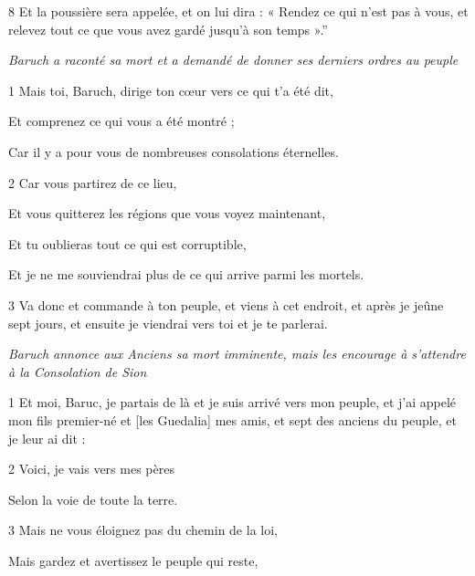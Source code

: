 \par 8 Et la poussière sera appelée, et on lui dira : « Rendez ce qui n'est pas à vous, et relevez tout ce que vous avez gardé jusqu'à son temps ».''



\par \textit{Baruch a raconté sa mort et a demandé de donner ses derniers ordres au peuple}

\par 1 Mais toi, Baruch, dirige ton cœur vers ce qui t'a été dit,

\par Et comprenez ce qui vous a été montré ;

\par Car il y a pour vous de nombreuses consolations éternelles.

\par 2 Car vous partirez de ce lieu,

\par Et vous quitterez les régions que vous voyez maintenant,

\par Et tu oublieras tout ce qui est corruptible,

\par Et je ne me souviendrai plus de ce qui arrive parmi les mortels.

\par 3 Va donc et commande à ton peuple, et viens à cet endroit, et après je jeûne sept jours, et ensuite je viendrai vers toi et je te parlerai.

\par \textit{Baruch annonce aux Anciens sa mort imminente, mais les encourage à s'attendre à la Consolation de Sion}


\par 1 Et moi, Baruc, je partais de là et je suis arrivé vers mon peuple, et j'ai appelé mon fils premier-né et [les Guedalia] mes amis, et sept des anciens du peuple, et je leur ai dit :

\par 2 Voici, je vais vers mes pères

\par Selon la voie de toute la terre.

\par 3 Mais ne vous éloignez pas du chemin de la loi,

\par Mais gardez et avertissez le peuple qui reste,

